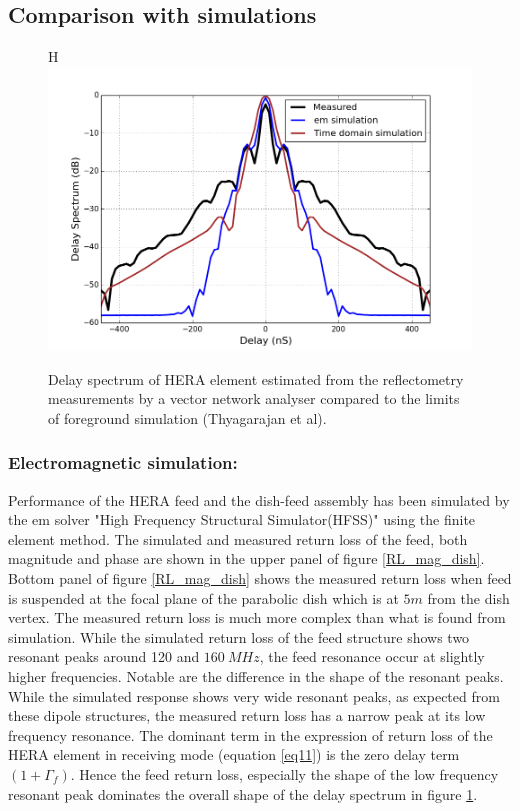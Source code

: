 \documentclass[twocolumn]{emulateapj}
\begin{document}
  \subsection{Comparison with simulations}
  \begin{figure}{H}
  \centering
  \includegraphics[width=\linewidth]{GB_reflectometry_part3/plot/simulation_comparison2.png}
  \caption{Delay spectrum of HERA element estimated from the reflectometry measurements by a vector network analyser compared to the limits of foreground simulation (Thyagarajan et al).}
   \label{fig:sim_em}
   \end{figure}
 \subsubsection{Electromagnetic simulation:}  
 Performance of the HERA feed and the dish-feed assembly has been simulated by
    the em solver "High Frequency Structural Simulator(HFSS)" using the finite
    element method.  The simulated and measured return loss of the feed, both
    magnitude and phase are shown in the upper panel of figure
    \ref{RL_mag_dish}. Bottom panel of figure \ref{RL_mag_dish} shows the measured return loss when
    feed is suspended at the focal plane of the parabolic dish which is at $5m$
    from the dish vertex. The measured return loss is much more complex than what
    is found from simulation. 
    While the simulated return loss of the feed structure shows
    two resonant peaks around 120 and $160~MHz$, the feed resonance occur at
    slightly higher frequencies. Notable are the difference in the shape of the
    resonant peaks. While the simulated response shows very wide resonant peaks, as
    expected from these dipole structures, the measured return loss has
    a narrow peak at its low frequency resonance. The dominant term in the expression of  return loss of the HERA element in
    receiving mode (equation \ref{eq11}) is the zero delay term $(1+\Gamma_{f})$. Hence the feed return loss, especially the shape of the low frequency resonant peak dominates the overall shape of the delay spectrum in figure
    \ref{fig:sim_em}.\\
    
\end{document}

